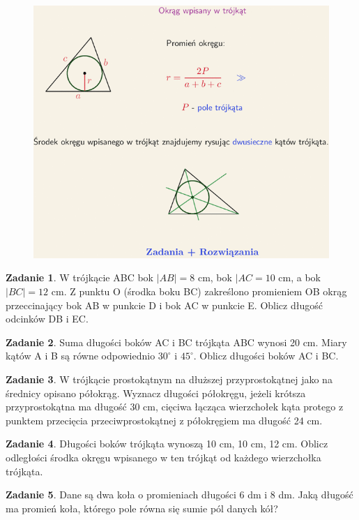 \documentclass[11pt]{article}
\theoremstyle{definition}
\newtheorem{zad}{Zadanie}
\begin{document}
\begin{figure}
\centering
\includegraphics[width=0.8\linewidth]{circle2.png}
\end{figure}

\begin{zad}
W trójkącie ABC bok $|AB| = 8$ cm, bok $|AC = 10$ cm, a bok $|BC| = 12$ cm. Z punktu O (środka boku BC) zakreślono promieniem OB okrąg przeccinający bok AB w punkcie D i bok AC w punkcie E. Oblicz długość odcinków DB i EC.
\end{zad}

\begin{zad}
Suma długości boków AC i BC trójkąta ABC wynosi 20 cm. Miary kątów A i B są równe odpowiednio $30^\circ$ i $45^\circ$. Oblicz długości boków AC i BC.
\end{zad}

\begin{zad}
W trójkącie prostokątnym na dłuższej przyprostokątnej jako na średnicy opisano półokrąg. Wyznacz długości półokręgu, jeżeli krótsza przyprostokątna ma długość 30 cm, cięciwa łącząca wierzchołek kąta protego z punktem przecięcia przeciwprostokątnej z półokręgiem ma długość 24 cm.
\end{zad}

\begin{zad}
Długości boków trójkąta wynoszą 10 cm, 10 cm, 12 cm. Oblicz odległości środka okręgu wpisanego w ten trójkąt od każdego wierzchołka trójkąta.
\end{zad}

\begin{zad}
Dane są dwa koła o promieniach długości 6 dm i 8 dm. Jaką długość ma promień koła, którego pole równa się sumie pól danych kół?
\end{zad}
\end{document}
